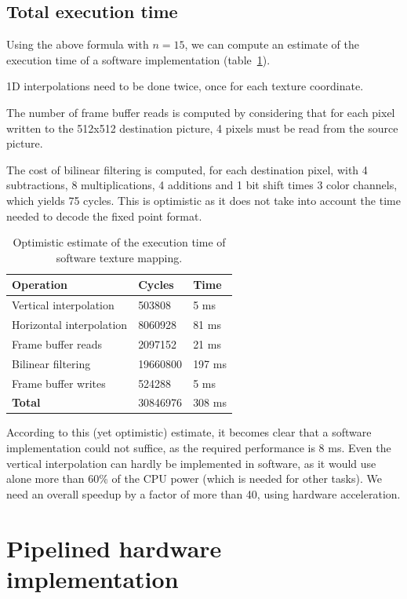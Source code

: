 \documentclass[a4paper,11pt]{kthesis}
\begin{document}
\subsection{Total execution time}
Using the above formula with $n=15$, we can compute an estimate of the execution time of a software implementation (table~\ref{tab:swtmutime}).

1D interpolations need to be done twice, once for each texture coordinate.

The number of frame buffer reads is computed by considering that for each pixel written to the 512x512 destination picture, 4 pixels must be read from the source picture.

The cost of bilinear filtering is computed, for each destination pixel, with 4 subtractions, 8 multiplications, 4 additions and 1 bit shift times 3 color channels, which yields 75 cycles. This is optimistic as it does not take into account the time needed to decode the fixed point format.

\begin{table}
\centering
\begin{tabular}{|l|l|l|}
\hline
\textbf{Operation} & \textbf{Cycles} & \textbf{Time} \\
\hline
Vertical interpolation & 503808 & 5 ms \\
\hline
Horizontal interpolation & 8060928 & 81 ms \\
\hline
Frame buffer reads & 2097152 & 21 ms \\
\hline
Bilinear filtering & 19660800 & 197 ms \\
\hline
Frame buffer writes & 524288 & 5 ms \\
\hline
\textbf{Total} & 30846976 & 308 ms \\
\hline
\end{tabular}
\caption{Optimistic estimate of the execution time of software texture mapping.}\label{tab:swtmutime}
\end{table}

According to this (yet optimistic) estimate, it becomes clear that a software implementation could not suffice, as the required performance is 8 ms. Even the vertical interpolation can hardly be implemented in software, as it would use alone more than 60\% of the CPU power (which is needed for other tasks). We need an overall speedup by a factor of more than 40, using hardware acceleration.

\section{Pipelined hardware implementation}
\end{document}
